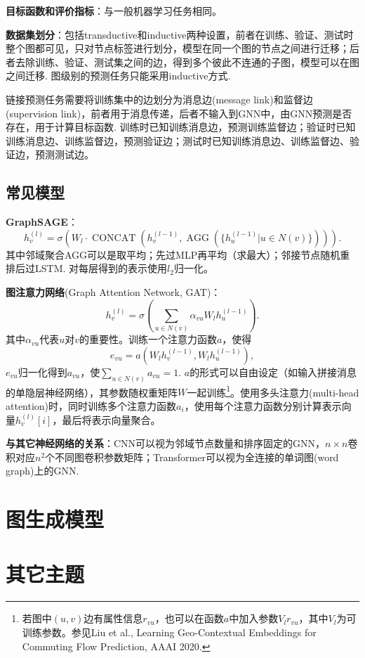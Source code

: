 \par \textbf{目标函数和评价指标}：与一般机器学习任务相同。

\par \textbf{数据集划分}：包括transductive和inductive两种设置，前者在训练、验证、测试时整个图都可见，只对节点标签进行划分，模型在同一个图的节点之间进行迁移；后者去除训练、验证、测试集之间的边，得到多个彼此不连通的子图，模型可以在图之间迁移. 图级别的预测任务只能采用inductive方式. 
\par 链接预测任务需要将训练集中的边划分为消息边(message link)和监督边(supervision link)，前者用于消息传递，后者不输入到GNN中，由GNN预测是否存在，用于计算目标函数. 训练时已知训练消息边，预测训练监督边；验证时已知训练消息边、训练监督边，预测验证边；测试时已知训练消息边、训练监督边、验证边，预测测试边。

\subsection{常见模型}
\par \textbf{GraphSAGE}：
\begin{equation}
    h_v^{(l)}=\sigma(W_l \cdot \operatorname{CONCAT}(h_v^{(l-1)},\operatorname{AGG}(\{h_u^{(l-1)}\vert u\in N(v)\}))).
\end{equation}
其中邻域聚合AGG可以是取平均；先过MLP再平均（求最大）；邻接节点随机重排后过LSTM. 对每层得到的表示使用$l_2$归一化。
\par \textbf{图注意力网络}(Graph Attention Network, GAT)：
\begin{equation}
    h_v^{(l)}=\sigma(\sum_{u\in N(v)}\alpha_{vu}W_l h_u^{(l-1)} ).
\end{equation}
其中$\alpha_{vu}$代表$u$对$v$的重要性。训练一个注意力函数$a$，使得
\begin{equation}
    e_{vu}=a(W_l h_v^{(l-1)},W_l h_u^{(l-1)}),
\end{equation}
$e_{vu}$归一化得到$a_{vu}$，使$\sum_{u\in N(v)}a_{vu}=1$. $a$的形式可以自由设定（如输入拼接消息的单隐层神经网络），其参数随权重矩阵$W$一起训练\footnote{若图中$(u,v)$边有属性信息$r_{vu}$，也可以在函数$a$中加入参数$V_lr_{vu}$，其中$V_l$为可训练参数。参见Liu et al., Learning Geo-Contextual Embeddings for Commuting Flow Prediction, AAAI 2020.}。使用多头注意力(multi-head attention)时，同时训练多个注意力函数$a_i$，使用每个注意力函数分别计算表示向量$h_v^{(l)}[i]$，最后将表示向量聚合。

\par \textbf{与其它神经网络的关系}：CNN可以视为邻域节点数量和排序固定的GNN，$n\times n$卷积对应$n^2$个不同图卷积参数矩阵；Transformer可以视为全连接的单词图(word graph)上的GNN.


\section{图生成模型}


\section{其它主题}